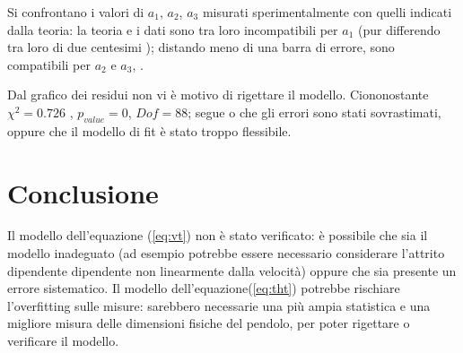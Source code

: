 \documentclass{article}
\begin{document}
Si confrontano i valori di $a_1$, $a_2$, $a_3$ misurati sperimentalmente con quelli indicati dalla teoria: la teoria e i dati sono tra loro incompatibili per $a_1$ (pur differendo tra loro di due centesimi ); distando meno di una barra di errore, sono compatibili per $a_2$ e $a_3$, . 


Dal grafico dei residui non vi è motivo di rigettare il modello.
Ciononostante  $\chi^2=0.726$ , $p_{value}=0$, $Dof=88$; segue o che gli errori sono stati sovrastimati, oppure che il modello di fit è stato troppo flessibile.



\section{Conclusione}

Il modello dell'equazione (\ref{eq:vt}) non è stato verificato: è possibile che sia il modello inadeguato (ad esempio potrebbe essere necessario considerare l'attrito dipendente dipendente non linearmente dalla velocità) oppure che sia presente un errore sistematico.
Il modello dell'equazione(\ref{eq:tht}) potrebbe rischiare l'overfitting sulle misure: sarebbero necessarie una più ampia statistica e una migliore misura delle dimensioni fisiche del pendolo, per poter rigettare o verificare il modello.
\end{document}
